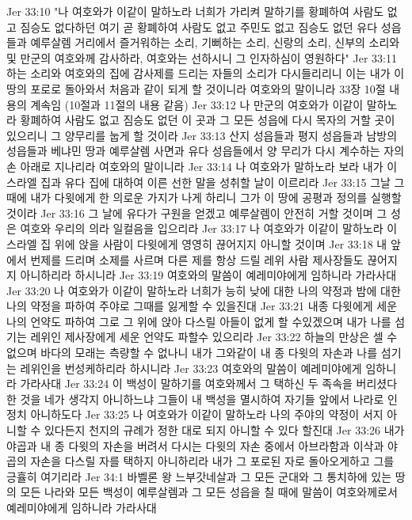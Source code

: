 Jer 33:10  "나 여호와가 이같이 말하노라 너희가 가리켜 말하기를 황폐하여 사람도 없고 짐승도 없다하던 여기 곧 황폐하여 사람도 없고 주민도 없고 짐승도 없던 유다 성읍들과 예루살렘 거리에서 즐거워하는 소리, 기뻐하는 소리, 신랑의 소리, 신부의 소리와 및 만군의 여호와께 감사하라, 여호와는 선하시니 그 인자하심이 영원하다"
Jer 33:11  하는 소리와 여호와의 집에 감사제를 드리는 자들의 소리가 다시들리리니 이는 내가 이 땅의 포로로 돌아와서 처음과 같이 되게 할 것이니라 여호와의 말이니라 33장 10절 내용의 계속임 (10절과 11절의 내용 같음)
Jer 33:12  나 만군의 여호와가 이같이 말하노라 황폐하여 사람도 없고 짐승도 없던 이 곳과 그 모든 성읍에 다시 목자의 거할 곳이 있으리니 그 양무리를 눕게 할 것이라
Jer 33:13  산지 성읍들과 평지 성읍들과 남방의 성읍들과 베냐민 땅과 예루살렘 사면과 유다 성읍들에서 양 무리가 다시 계수하는 자의 손 아래로 지나리라 여호와의 말이니라
Jer 33:14  나 여호와가 말하노라 보라 내가 이스라엘 집과 유다 집에 대하여 이른 선한 말을 성취할 날이 이르리라
Jer 33:15  그날 그 때에 내가 다윗에게 한 의로운 가지가 나게 하리니 그가 이 땅에 공평과 정의를 실행할 것이라
Jer 33:16  그 날에 유다가 구원을 얻겠고 예루살렘이 안전히 거할 것이며 그 성은 여호와 우리의 의라 일컬음을 입으리라
Jer 33:17  나 여호와가 이같이 말하노라 이스라엘 집 위에 앉을 사람이 다윗에게 영영히 끊어지지 아니할 것이며
Jer 33:18  내 앞에서 번제를 드리며 소제를 사르며 다른 제를 항상 드릴 레위 사람 제사장들도 끊어지지 아니하리라 하시니라
Jer 33:19  여호와의 말씀이 예레미야에게 임하니라 가라사대
Jer 33:20  나 여호와가 이같이 말하노라 너희가 능히 낮에 대한 나의 약정과 밤에 대한 나의 약정을 파하여 주야로 그때를 잃게할 수 있을진대
Jer 33:21  내종 다윗에게 세운 나의 언약도 파하여 그로 그 위에 앉아 다스릴 아들이 없게 할 수있겠으며 내가 나를 섬기는 레위인 제사장에게 세운 언약도 파할수 있으리라
Jer 33:22  하늘의 만상은 셀 수 없으며 바다의 모래는 측량할 수 없나니 내가 그와같이 내 종 다윗의 자손과 나를 섬기는 레위인을 번성케하리라 하시니라
Jer 33:23  여호와의 말씀이 예레미야에게 임하니라 가라사대
Jer 33:24  이 백성이 말하기를 여호와께서 그 택하신 두 족속을 버리셨다 한 것을 네가 생각지 아니하느냐 그들이 내 백성을 멸시하여 자기들 앞에서 나라로 인정치 아니하도다
Jer 33:25  나 여호와가 이같이 말하노라 나의 주야의 약정이 서지 아니할 수 있다든지 천지의 규례가 정한 대로 되지 아니할 수 있다 할진대
Jer 33:26  내가 야곱과 내 종 다윗의 자손을 버려서 다시는 다윗의 자손 중에서 아브라함과 이삭과 야곱의 자손을 다스릴 자를 택하지 아니하리라 내가 그 포로된 자로 돌아오게하고 그를 긍휼히 여기리라
Jer 34:1  바벨론 왕 느부갓네살과 그 모든 군대와 그 통치하에 있는 땅의 모든 나라와 모든 백성이 예루살렘과 그 모든 성읍을 칠 때에 말씀이 여호와께로서 예레미야에게 임하니라 가라사대
